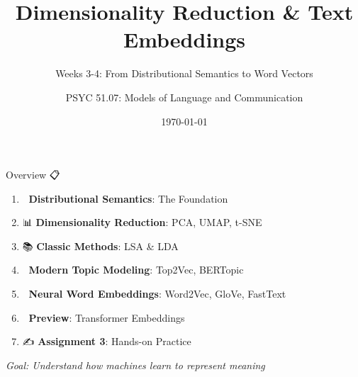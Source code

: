 \documentclass[aspectratio=169]{beamer}
\title{Dimensionality Reduction \& Text Embeddings}
\subtitle{Weeks 3-4: From Distributional Semantics to Word Vectors}
\author{PSYC 51.07: Models of Language and Communication}
\date{\today}
\begin{document}
\begin{frame}[shrink=10]
\titlepage
\end{frame}

\begin{frame}[shrink=10]{Overview 📋}
\large
\begin{enumerate}\setlength{\itemsep}{0pt}
    \item 🧠 \textbf{Distributional Semantics}: The Foundation
    \item 📊 \textbf{Dimensionality Reduction}: PCA, UMAP, t-SNE
    \item 📚 \textbf{Classic Methods}: LSA \& LDA
    \item 🎨 \textbf{Modern Topic Modeling}: Top2Vec, BERTopic
    \item 🚀 \textbf{Neural Word Embeddings}: Word2Vec, GloVe, FastText
    \item 🔮 \textbf{Preview}: Transformer Embeddings
    \item ✍️ \textbf{Assignment 3}: Hands-on Practice
\end{enumerate}

\vspace{1em}
\textit{Goal: Understand how machines learn to represent meaning}
\end{frame}
\end{document}
